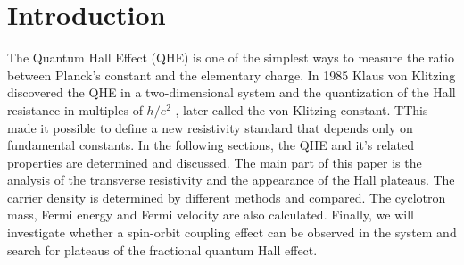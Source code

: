 \section{Introduction}
The Quantum Hall Effect (QHE) is one of the simplest ways to measure the ratio between Planck's constant 
and the elementary charge. In 1985 Klaus von Klitzing discovered the QHE in a two-dimensional system and 
the quantization of the Hall resistance in multiples of $h/e^2$ \cite{Nobelpreis}, later called the von 
Klitzing constant.
TThis made it possible to define a new resistivity standard that depends only on fundamental constants. 
In the following sections, the QHE and it's related properties are determined and discussed. 
The main part of this paper is the analysis of the transverse resistivity and the appearance of the Hall plateaus.
The carrier density is determined by different methods and compared. 
The cyclotron mass, Fermi energy and Fermi velocity are also calculated.
Finally, we will investigate whether a spin-orbit coupling effect can be observed 
in the system and search for plateaus of the fractional quantum Hall effect.\\

